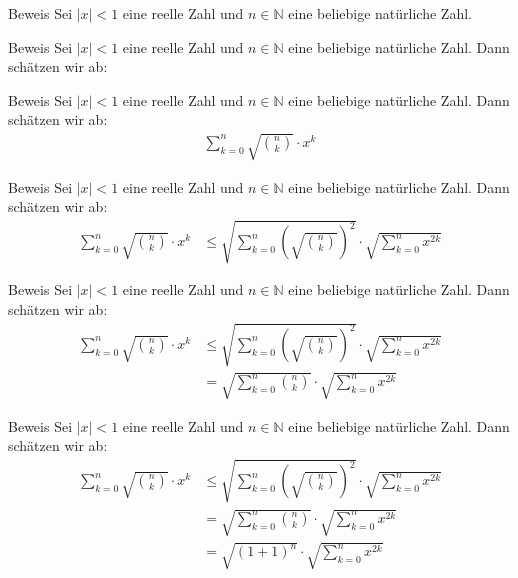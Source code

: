 \documentclass[10pt]{beamer}
\def\bN{\mathbb{N}}
\begin{document}
\begin{frame}{Beweis}
    Sei \( \left\vert x \right\vert < 1 \) eine reelle Zahl und \( n \in \bN \) eine beliebige natürliche Zahl.
\end{frame}



\begin{frame}{Beweis}
    Sei \( \left\vert x \right\vert < 1 \) eine reelle Zahl und \( n \in \bN \) eine beliebige natürliche Zahl. Dann schätzen wir ab:
\end{frame}



\begin{frame}{Beweis}
    Sei \( \left\vert x \right\vert < 1 \) eine reelle Zahl und \( n \in \bN \) eine beliebige natürliche Zahl. Dann schätzen wir ab:
    \begin{align*}
        \sum_{k = 0}^{n} \sqrt{\binom{n}{k}} \cdot x^{k}
    \end{align*}
\end{frame}



\begin{frame}{Beweis}
    Sei \( \left\vert x \right\vert < 1 \) eine reelle Zahl und \( n \in \bN \) eine beliebige natürliche Zahl. Dann schätzen wir ab:
    \begin{align*}
        \sum_{k = 0}^{n} \sqrt{\binom{n}{k}} \cdot x^{k}
        & \leq \sqrt{\sum_{k = 0}^{n} \left( \sqrt{\binom{n}{k}} \right)^{2}} \cdot \sqrt{\sum_{k = 0}^{n} x^{2k}}
    \end{align*}
\end{frame}



\begin{frame}{Beweis}
    Sei \( \left\vert x \right\vert < 1 \) eine reelle Zahl und \( n \in \bN \) eine beliebige natürliche Zahl. Dann schätzen wir ab:
    \begin{align*}
        \sum_{k = 0}^{n} \sqrt{\binom{n}{k}} \cdot x^{k}
        & \leq \sqrt{\sum_{k = 0}^{n} \left( \sqrt{\binom{n}{k}} \right)^{2}} \cdot \sqrt{\sum_{k = 0}^{n} x^{2k}} \\
        & = \sqrt{\sum_{k = 0}^{n} \binom{n}{k}} \cdot \sqrt{\sum_{k = 0}^{n} x^{2k}}
    \end{align*}
\end{frame}



\begin{frame}{Beweis}
    Sei \( \left\vert x \right\vert < 1 \) eine reelle Zahl und \( n \in \bN \) eine beliebige natürliche Zahl. Dann schätzen wir ab:
    \begin{align*}
        \sum_{k = 0}^{n} \sqrt{\binom{n}{k}} \cdot x^{k}
        & \leq \sqrt{\sum_{k = 0}^{n} \left( \sqrt{\binom{n}{k}} \right)^{2}} \cdot \sqrt{\sum_{k = 0}^{n} x^{2k}} \\
        & = \sqrt{\sum_{k = 0}^{n} \binom{n}{k}} \cdot \sqrt{\sum_{k = 0}^{n} x^{2k}} \\
        & = \sqrt{\left( 1 + 1 \right)^{n}} \cdot \sqrt{\sum_{k = 0}^{n} x^{2k}} 
    \end{align*}
\end{frame}
\end{document}
